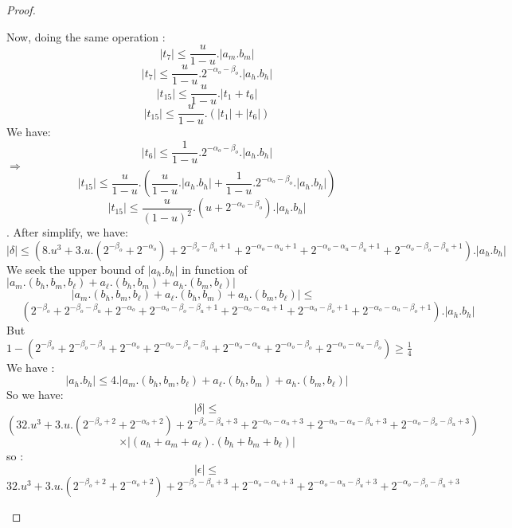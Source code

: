 \begin{proof}
\begin{itemize}
Now, doing the same operation  :
$$ \lvert t_7 \rvert \le \frac{u}{1-u} .\lvert a_m.b_m \rvert $$
$$ \lvert t_7 \rvert \le \frac{u}{1-u} .2^{-\alpha_o -\beta_o}. \lvert a_h.b_h \rvert $$
$$ \lvert t_{15} \rvert \le \frac{u}{1-u} .\lvert t_1 + t_6 \rvert $$
$$ \lvert t_{15} \rvert \le \frac{u}{1-u} .(\lvert t_1 \rvert + \lvert t_6 \rvert) $$
We have: 
$$ \lvert t_6 \rvert \le \frac{1}{1-u} .2^{-\alpha_o -\beta_o}. \lvert a_h.b_h \rvert $$
$\Rightarrow$
$$ \lvert t_{15} \rvert \le \frac{u}{1-u} .(\frac{u}{1-u} .\lvert a_h.b_h \rvert + \frac{1}{1-u} .2^{-\alpha_o -\beta_o}. \lvert a_h.b_h \rvert) $$
$$ \lvert t_{15} \rvert \le \frac{u}{(1-u)^2} .(u  + 2^{-\alpha_o -\beta_o}). \lvert a_h.b_h \rvert $$.
After simplify, we have:
$$\lvert \delta \rvert \le (8.u^3 + 3.u.(2^{-\beta_o} + 2^{-\alpha_o}) + 2^{-\beta_o - \beta_u +1} + 2^{-\alpha_o - \alpha_u +1} + 2^{-\alpha_o - \alpha_u  - \beta_u +1} + 2^{-\alpha_o -  \beta_o -\beta_u +1}).\lvert a_h.b_h \rvert$$
We seek the upper bound of $\lvert a_h.b_h \rvert$ in function of $\lvert a_m.(b_h,b_m,b_{\ell}) + a_{\ell}.(b_h,b_m) +a_h.( b_m,b_{\ell}) \rvert$
$$\lvert a_m.(b_h,b_m,b_{\ell}) + a_{\ell}.(b_h,b_m) +a_h.( b_m,b_{\ell}) \rvert \le \ \ \ \ \ \ \ \ \ \  \ $$
$$ \ \  \ \ \ \ (2^{-\beta_o}+2^{-\beta_o -\beta_u}+2^{-\alpha_o}+2^{-\alpha_o -\beta_o -\beta_u+1}+
2^{-\alpha_o - \alpha_u+1} + 2^{-\alpha_o -\beta_o+1} + 2^{-\alpha_o - \alpha_u -\beta_o+1}). \lvert a_h.b_h \rvert
$$
But $1 - (2^{-\beta_o}+2^{-\beta_o -\beta_u}+2^{-\alpha_o}+2^{-\alpha_o -\beta_o -\beta_u}+
2^{-\alpha_o - \alpha_u} + 2^{-\alpha_o -\beta_o} + 2^{-\alpha_o - \alpha_u -\beta_o})\ge \frac{1}{4}$
We have :
$$\lvert a_h.b_h \rvert \le 4.\lvert a_m.(b_h,b_m,b_{\ell}) + a_{\ell}.(b_h,b_m) +a_h.( b_m,b_{\ell}) \rvert$$
So we have:
$$\lvert \delta \rvert \le $$ 
$$ (32.u^3 + 3.u.(2^{-\beta_o+2} + 2^{-\alpha_o+2}) + 2^{-\beta_o - \beta_u +3} + 2^{-\alpha_o - \alpha_u +3} + 2^{-\alpha_o - \alpha_u  - \beta_u +3} + 2^{-\alpha_o -  \beta_o -\beta_u +3})$$
$$ \times \lvert (a_h+a_m+a_{\ell}).(b_h+b_m+b_{\ell})\rvert$$
so :
$$\lvert \epsilon \rvert \le $$
$$ 32.u^3 + 3.u.(2^{-\beta_o+2} + 2^{-\alpha_o+2}) + 2^{-\beta_o - \beta_u +3} + 2^{-\alpha_o - \alpha_u +3} + 2^{-\alpha_o - \alpha_u  - \beta_u +3} + 2^{-\alpha_o -  \beta_o -\beta_u +3}$$
\end{itemize}
\end{proof}